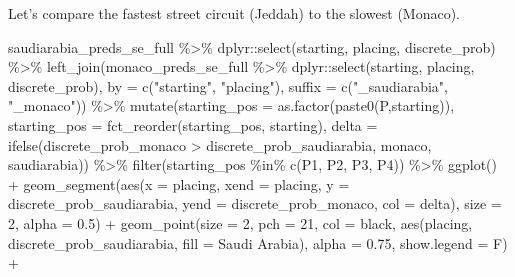 \documentclass[
]{book}
\newenvironment{Shaded}{\begin{snugshade}}{\end{snugshade}}
\newcommand{\AttributeTok}[1]{\textcolor[rgb]{0.77,0.63,0.00}{#1}}
\newcommand{\DecValTok}[1]{\textcolor[rgb]{0.00,0.00,0.81}{#1}}
\newcommand{\FloatTok}[1]{\textcolor[rgb]{0.00,0.00,0.81}{#1}}
\newcommand{\FunctionTok}[1]{\textcolor[rgb]{0.00,0.00,0.00}{#1}}
\newcommand{\NormalTok}[1]{#1}
\newcommand{\SpecialCharTok}[1]{\textcolor[rgb]{0.00,0.00,0.00}{#1}}
\newcommand{\StringTok}[1]{\textcolor[rgb]{0.31,0.60,0.02}{#1}}
\begin{document}
Let's compare the fastest street circuit (Jeddah) to the slowest (Monaco).

\begin{Shaded}
\begin{Highlighting}[]
\NormalTok{saudiarabia\_preds\_se\_full }\SpecialCharTok{\%\textgreater{}\%}
\NormalTok{  dplyr}\SpecialCharTok{::}\FunctionTok{select}\NormalTok{(starting, placing, discrete\_prob) }\SpecialCharTok{\%\textgreater{}\%}
  \FunctionTok{left\_join}\NormalTok{(monaco\_preds\_se\_full }\SpecialCharTok{\%\textgreater{}\%}
\NormalTok{  dplyr}\SpecialCharTok{::}\FunctionTok{select}\NormalTok{(starting, placing, discrete\_prob), }\AttributeTok{by =} \FunctionTok{c}\NormalTok{(}\StringTok{"starting"}\NormalTok{, }\StringTok{"placing"}\NormalTok{), }\AttributeTok{suffix =} \FunctionTok{c}\NormalTok{(}\StringTok{"\_saudiarabia"}\NormalTok{, }\StringTok{"\_monaco"}\NormalTok{)) }\SpecialCharTok{\%\textgreater{}\%}
  \FunctionTok{mutate}\NormalTok{(}\AttributeTok{starting\_pos =} \FunctionTok{as.factor}\NormalTok{(}\FunctionTok{paste0}\NormalTok{(}\StringTok{\textquotesingle{}P\textquotesingle{}}\NormalTok{,starting)),}
         \AttributeTok{starting\_pos =} \FunctionTok{fct\_reorder}\NormalTok{(starting\_pos, starting),}
         \AttributeTok{delta =} \FunctionTok{ifelse}\NormalTok{(discrete\_prob\_monaco }\SpecialCharTok{\textgreater{}}\NormalTok{ discrete\_prob\_saudiarabia, }\StringTok{\textquotesingle{}monaco\textquotesingle{}}\NormalTok{, }\StringTok{\textquotesingle{}saudiarabia\textquotesingle{}}\NormalTok{)) }\SpecialCharTok{\%\textgreater{}\%}
  \FunctionTok{filter}\NormalTok{(starting\_pos }\SpecialCharTok{\%in\%} \FunctionTok{c}\NormalTok{(}\StringTok{\textquotesingle{}P1\textquotesingle{}}\NormalTok{, }\StringTok{\textquotesingle{}P2\textquotesingle{}}\NormalTok{, }\StringTok{\textquotesingle{}P3\textquotesingle{}}\NormalTok{, }\StringTok{\textquotesingle{}P4\textquotesingle{}}\NormalTok{)) }\SpecialCharTok{\%\textgreater{}\%}
  \FunctionTok{ggplot}\NormalTok{() }\SpecialCharTok{+}
  \FunctionTok{geom\_segment}\NormalTok{(}\FunctionTok{aes}\NormalTok{(}\AttributeTok{x =}\NormalTok{ placing, }\AttributeTok{xend =}\NormalTok{ placing, }\AttributeTok{y =}\NormalTok{ discrete\_prob\_saudiarabia, }\AttributeTok{yend =}\NormalTok{ discrete\_prob\_monaco, }\AttributeTok{col =}\NormalTok{ delta),}
               \AttributeTok{size =} \DecValTok{2}\NormalTok{, }\AttributeTok{alpha =} \FloatTok{0.5}\NormalTok{) }\SpecialCharTok{+}
  \FunctionTok{geom\_point}\NormalTok{(}\AttributeTok{size =} \DecValTok{2}\NormalTok{, }\AttributeTok{pch =} \DecValTok{21}\NormalTok{, }\AttributeTok{col =} \StringTok{\textquotesingle{}black\textquotesingle{}}\NormalTok{, }\FunctionTok{aes}\NormalTok{(placing, discrete\_prob\_saudiarabia, }\AttributeTok{fill =} \StringTok{\textquotesingle{}Saudi Arabia\textquotesingle{}}\NormalTok{), }\AttributeTok{alpha =} \FloatTok{0.75}\NormalTok{, }\AttributeTok{show.legend =}\NormalTok{ F) }\SpecialCharTok{+}

\end{Highlighting}
\end{Shaded}
\end{document}
